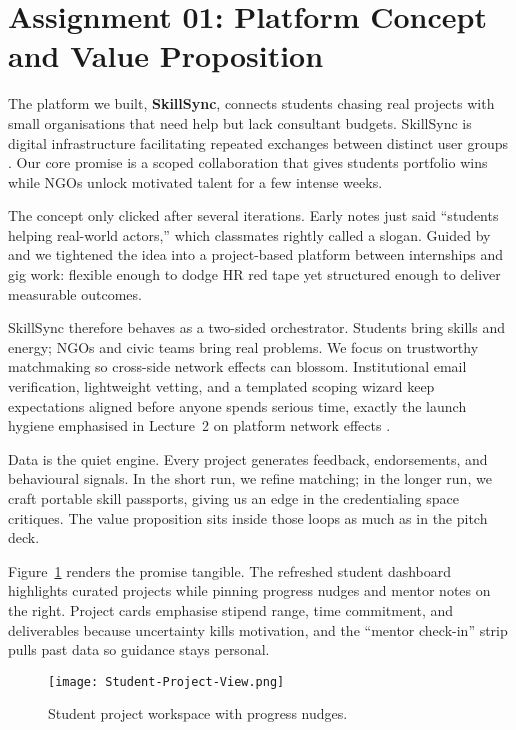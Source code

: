 \section*{Assignment 01: Platform Concept and Value Proposition}

The platform we built, \textbf{SkillSync}, connects students chasing real projects with small organisations that need help but lack consultant budgets. SkillSync is digital infrastructure facilitating repeated exchanges between distinct user groups \citep{Choudary2016}. Our core promise is a scoped collaboration that gives students portfolio wins while NGOs unlock motivated talent for a few intense weeks.

The concept only clicked after several iterations. Early notes just said ``students helping real-world actors,'' which classmates rightly called a slogan. Guided by \citet{Choudary2016} and \citet{Srnicek2017} we tightened the idea into a project-based platform between internships and gig work: flexible enough to dodge HR red tape yet structured enough to deliver measurable outcomes.

SkillSync therefore behaves as a two-sided orchestrator. Students bring skills and energy; NGOs and civic teams bring real problems. We focus on trustworthy matchmaking so cross-side network effects can blossom. Institutional email verification, lightweight vetting, and a templated scoping wizard keep expectations aligned before anyone spends serious time, exactly the launch hygiene emphasised in Lecture~2 on platform network effects \citep{Lecture02}.

Data is the quiet engine. Every project generates feedback, endorsements, and behavioural signals. In the short run, we refine matching; in the longer run, we craft portable skill passports, giving us an edge in the credentialing space \citet{Zuboff2019} critiques. The value proposition sits inside those loops as much as in the pitch deck.

Figure~\ref{fig:student-view} renders the promise tangible. The refreshed student dashboard highlights curated projects while pinning progress nudges and mentor notes on the right. Project cards emphasise stipend range, time commitment, and deliverables because uncertainty kills motivation, and the ``mentor check-in'' strip pulls past data so guidance stays personal.

\begin{figure}[H]
  \centering
  \texttt{[image: Student-Project-View.png]}
  \caption{Student project workspace with progress nudges.}
  \label{fig:student-view}
\end{figure}

